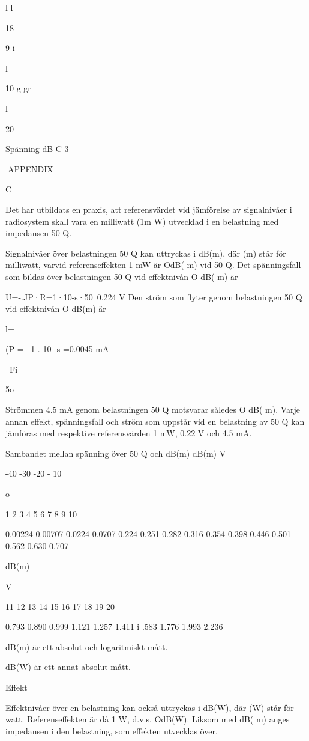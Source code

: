 l
l

18

9
i

l

10 g gr

l

20

Spänning
dB
C-3

APPENDIX

C

Det har utbildats en praxis, att referensvärdet vid jämförelse av signalnivåer i radiosystem skall vara en milliwatt (1m W) utvecklad i en belastning med impedansen 50 Q.

Signalnivåer över belastningen 50 Q kan
uttryckas i dB(m), där (m) står för milliwatt,
varvid referenseffekten 1 mW är OdB( m) vid
50 Q.
Det spänningsfall som bildas över belastningen 50 Q vid effektnivån O dB( m) är

U=-.JP·R=1·10-s·50~0.224 V
Den ström som flyter genom belastningen
50 Q vid effektnivån O dB(m) är

l=

(P =~ 1 . 10 -s =0.0045 mA

~Fi

5o

Strömmen 4.5 mA genom belastningen 50 Q
motsvarar således O dB( m).
Varje annan effekt, spänningsfall och ström
som uppstår vid en belastning av 50 Q kan
jämföras med respektive referensvärden
1 mW, 0.22 V och 4.5 mA.

Sambandet mellan spänning över 50 Q
och dB(m)
dB(m) V

-40
-30
-20
- 10

o

1
2
3
4
5
6
7
8
9
10

0.00224
0.00707
0.0224
0.0707
0.224
0.251
0.282
0.316
0.354
0.398
0.446
0.501
0.562
0.630
0.707

dB(m)

V

11
12
13
14
15
16
17
18
19
20

0.793
0.890
0.999
1.121
1.257
1.411
i .583
1.776
1.993
2.236

dB(m) är ett absolut och logaritmiskt mått.

dB(W) är ett annat absolut mått.

Effekt

Effektnivåer över en belastning kan också
uttryckas i dB(W), där (W) står för watt.
Referenseffekten är då 1 W, d.v.s. OdB(W).
Liksom med dB( m) anges impedansen i den
belastning, som effekten utvecklas över.

